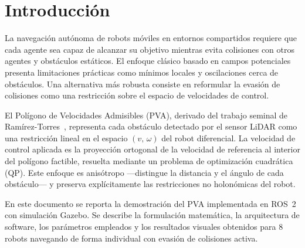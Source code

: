 \section{Introducción}

La navegación autónoma de robots móviles en entornos compartidos requiere que cada agente sea capaz de alcanzar su objetivo mientras evita colisiones con otros agentes y obstáculos estáticos. El enfoque clásico basado en campos potenciales~\cite{khatib1986realtime} presenta limitaciones prácticas como mínimos locales y oscilaciones cerca de obstáculos. Una alternativa más robusta consiste en reformular la evasión de colisiones como una restricción sobre el espacio de velocidades de control.

El Polígono de Velocidades Admisibles (PVA), derivado del trabajo seminal de Ramírez-Torres~\cite{ramirez2001collision}, representa cada obstáculo detectado por el sensor LiDAR como una restricción lineal en el espacio $(v,\,\omega)$ del robot diferencial. La velocidad de control aplicada es la proyección ortogonal de la velocidad de referencia al interior del polígono factible, resuelta mediante un problema de optimización cuadrática (QP). Este enfoque es anisótropo —distingue la distancia y el ángulo de cada obstáculo— y preserva explícitamente las restricciones no holonómicas del robot.

En este documento se reporta la demostración del PVA implementada en ROS~2 con simulación Gazebo. Se describe la formulación matemática, la arquitectura de software, los parámetros empleados y los resultados visuales obtenidos para 8 robots navegando de forma individual con evasión de colisiones activa.
